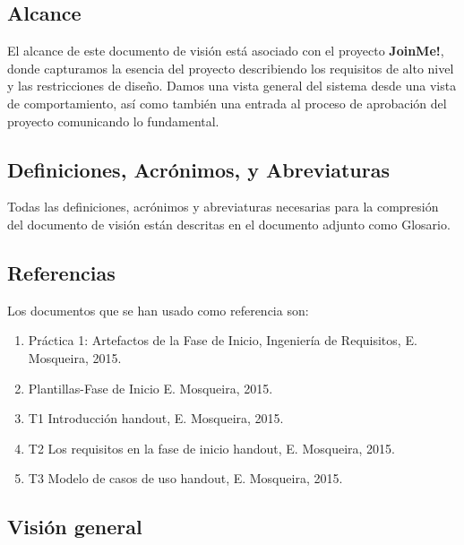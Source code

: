 \documentclass[12pt, a4paper, titlepage]{article}
\begin{document}
\subsection{Alcance}

El alcance de este documento de visión está asociado con el proyecto \textbf{JoinMe!}, donde capturamos la esencia del proyecto describiendo los requisitos de alto nivel y las restricciones de diseño. Damos una vista general del sistema desde una vista de comportamiento, así como también una entrada al proceso de aprobación del proyecto comunicando lo fundamental.


\subsection{Definiciones, Acrónimos, y Abreviaturas}

Todas las definiciones, acrónimos y abreviaturas necesarias para la compresión del
documento de visión están descritas en el documento adjunto como Glosario.


\subsection{Referencias}

Los documentos que se han usado como referencia son:
\begin{enumerate}
\item Práctica 1: Artefactos de la Fase de Inicio, Ingeniería de Requisitos, E. Mosqueira, 2015.
\item Plantillas-Fase de Inicio E. Mosqueira, 2015.
\item T1 Introducción handout, E. Mosqueira, 2015.
\item T2 Los requisitos en la fase de inicio handout, E. Mosqueira, 2015.
\item T3 Modelo de casos de uso handout, E. Mosqueira, 2015.
\end{enumerate}

\subsection{Visión general}
\end{document}

